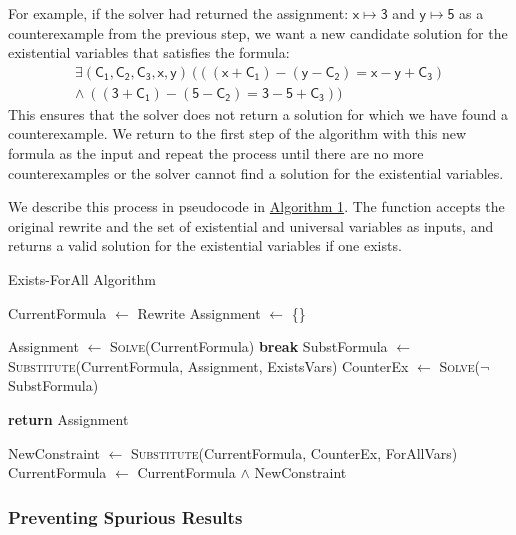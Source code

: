 \documentclass[review, anonymous, acmsmall]{acmart}
\newcommand{\inline}[1]{$\mathsf{#1}$}
\begin{document}
\begin{itemize}
    For example, if the solver had returned the assignment: \inline{x \mapsto 3} and \inline{y \mapsto 5} as a counterexample from the previous step, we want a new candidate solution for the existential variables that satisfies the formula:
    \begin{align*} 
    \mathsf{\exists(C_1, C_2, C_3, x, y)\ (((x + C_1)  - (y - C_2)  = x - y + C_3)} \\
    \mathsf{\land \ ((3 + C_1)  - (5 - C_2) = 3 - 5 + C_3))}
    \end{align*}
    This ensures that the solver does not return a solution for which we have found a counterexample. We return to the first step of the algorithm with this new formula as the input and repeat the process until there are no more counterexamples or the solver cannot find a solution for the existential variables.
\end{itemize}

We describe this process in pseudocode in \hyperref[alg:exists-forall]{Algorithm 1}. The function accepts the original rewrite and the set of existential and universal variables as inputs, and returns a valid solution for the existential variables if one exists. 

\begin{algorithm} 
\caption{Exists-ForAll Algorithm}\label{alg:exists-forall}
\begin{algorithmic}[1]
\State CurrentFormula $\gets$ Rewrite
\State Assignment $\gets$ \{\}

\State Assignment $\gets$ \textsc{Solve}(CurrentFormula) 
\State \textbf{break} 
\EndIf
\State SubstFormula $\gets$ \textsc{Substitute}(CurrentFormula, Assignment, ExistsVars) 
\State CounterEx $\gets$ \textsc{Solve}($\neg$SubstFormula) 

\State \textbf{return} Assignment 
\EndIf

\State NewConstraint $\gets$ \textsc{Substitute}(CurrentFormula, CounterEx, ForAllVars)
\State CurrentFormula $\gets$ CurrentFormula $\land$ NewConstraint

\EndWhile
\EndProcedure
\end{algorithmic}
\end{algorithm}


\subsubsection{Preventing Spurious Results}
\end{document}
